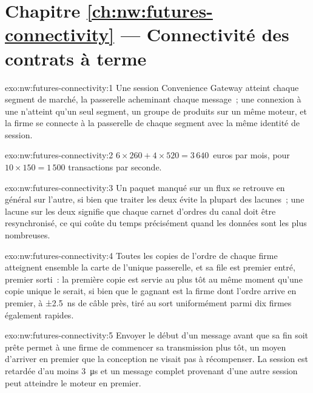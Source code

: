 \section*{Chapitre \ref{ch:nw:futures-connectivity} --- Connectivité des contrats à terme}

\begin{solution}{exo:nw:futures-connectivity:1}
Une session Convenience Gateway atteint chaque segment de marché, la passerelle acheminant chaque message~; une connexion à une 
n'atteint qu'un seul segment, un groupe de produits sur un même moteur, et la firme se connecte à la passerelle de chaque segment avec la même
identité de session.
\end{solution}

\begin{solution}{exo:nw:futures-connectivity:2}
$6 \times 260 + 4 \times 520 = 3\,640$~euros par mois, pour $10 \times 150 = 1\,500$ transactions par seconde.
\end{solution}

\begin{solution}{exo:nw:futures-connectivity:3}
Un paquet manqué sur un flux se retrouve en général sur l'autre, si bien que traiter les deux évite la plupart des lacunes~; une lacune sur les deux signifie que chaque carnet d'ordres
du canal doit être resynchronisé, ce qui coûte du temps précisément quand les données sont les plus nombreuses.
\end{solution}

\begin{solution}{exo:nw:futures-connectivity:4}
Toutes les copies de l'ordre de chaque firme atteignent ensemble la carte de l'unique passerelle, et sa file est premier entré, premier sorti~: la première copie est
servie au plus tôt au même moment qu'une copie unique le serait, si bien que le gagnant est la firme dont l'ordre arrive en premier, à ±2.5~ns de câble près,
tiré au sort uniformément parmi dix firmes également rapides.
\end{solution}

\begin{solution}{exo:nw:futures-connectivity:5}
Envoyer le début d'un message avant que sa fin soit prête permet à une firme de commencer sa transmission plus tôt, un moyen d'arriver en premier que la
conception ne visait pas à récompenser. La session est retardée d'au moins \qty{3}{\micro\second} et un message complet provenant d'une autre session
peut atteindre le moteur en premier.
\end{solution}

